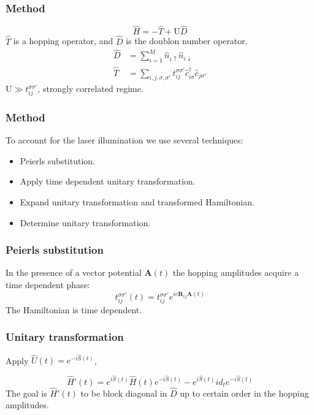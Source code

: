\documentclass{beamer}
\newcommand{\bs}[1] {\boldsymbol{#1}}
\begin{document}

\begin{frame}
\frametitle{Method}
\begin{equation*}
\hat{H} = -\hat{T} + \text{U}\hat{D}
\end{equation*}
$\hat{T}$ is a hopping operator, and $\hat{D}$ is the doublon number operator.
\begin{align*}
\hat{D} &= \sum_{i=1}^M \hat{n}_{i\uparrow}\hat{n}_{i\downarrow} \\
\hat{T} &= \sum_{i,j, \sigma, \sigma'} t_{ij}^{\sigma \sigma'} \hat{c}_{i \sigma}^\dagger \hat{c}_{j \sigma'}
\end{align*}
$\text{U} \gg t_{ij}^{\sigma \sigma'}$, strongly correlated regime.
\end{frame}


\begin{frame}
\frametitle{Method}
To account for the laser illumination we use several techniques:
\begin{itemize}
\item Peierls substitution.
\item Apply time dependent unitary transformation.
\item Expand unitary transformation and transformed Hamiltonian.
\item Determine unitary transformation.
\end{itemize}
\end{frame}


\begin{frame}
\frametitle{Peierls substitution}
In the presence of a vector potential $\bs{A}(t)$ the hopping amplitudes acquire a time dependent phase:
\begin{equation*}
\label{TimeDepHopping}
t_{ij}^{\sigma \sigma'}(t) = t_{ij}^{\sigma \sigma'} e^{ie\bs{R}_{ij}\bs{A}(t)}
\end{equation*}
The Hamiltonian is time dependent.
\end{frame}


\begin{frame}
\frametitle{Unitary transformation}
Apply $\hat{U}(t) = e^{-i\hat{S}(t)}$,

\begin{equation*}
\hat{H}'(t) = e^{i\hat{S}(t)} \hat{H}(t) e^{-i\hat{S}(t)} - e^{i\hat{S}(t)} id_t e^{-i\hat{S}(t)}
\end{equation*}
The goal is $\hat{H}'(t)$ to be block diagonal in $\hat{D}$ up to certain order in the hopping amplitudes.
\end{frame}
\end{document}

